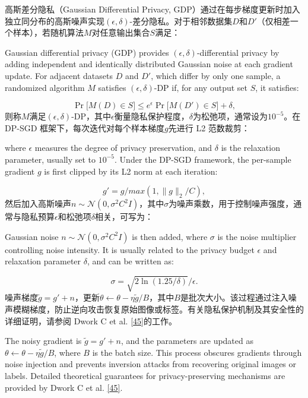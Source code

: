 高斯差分隐私（Gaussian Differential Privacy, GDP）通过在每步梯度更新时加入独立同分布的高斯噪声实现\((\epsilon, \delta)\)-差分隐私。对于相邻数据集\(D\)和\(D'\)（仅相差一个样本），若随机算法\(M\)对任意输出集合\(S\)满足：

Gaussian differential privacy (GDP) provides \((\epsilon, \delta)\)-differential privacy by adding independent and identically distributed Gaussian noise at each gradient update. For adjacent datasets \(D\) and \(D'\), which differ by only one sample, a randomized algorithm \(M\) satisfies \((\epsilon, \delta)\)-DP if, for any output set \(S\), it satisfies:

\begin{equation}\label{eq:dp-definition}
\Pr\lbrack M(D) \in S\rbrack \leq e^{\epsilon}\Pr\lbrack M(D') \in S\rbrack + \delta,
\end{equation}
则称\(M\)满足\((\epsilon, \delta)\)-DP，其中\(\epsilon\)衡量隐私保护程度，\(\delta\)为松弛项，通常设为\(10^{-5}\)。在 DP-SGD 框架下，每次迭代对每个样本梯度\(g\)先进行 L2 范数裁剪：

where \(\epsilon\) measures the degree of privacy preservation, and \(\delta\) is the relaxation parameter, usually set to \(10^{-5}\). Under the DP-SGD framework, the per-sample gradient \(g\) is first clipped by its L2 norm at each iteration:

\begin{equation}\label{eq:gradient-clip}
g' = g/max(1, \parallel g \parallel_{2}/C),
\end{equation}
然后加入高斯噪声\(n \sim \mathcal{N}(0,\sigma^{2}C^{2}I)\)，其中\(\sigma\)为噪声乘数，用于控制噪声强度，通常与隐私预算\(\epsilon\)和松弛项\(\delta\)相关，可写为：

Gaussian noise \(n \sim \mathcal{N}(0,\sigma^{2}C^{2}I)\) is then added, where \(\sigma\) is the noise multiplier controlling noise intensity. It is usually related to the privacy budget \(\epsilon\) and relaxation parameter \(\delta\), and can be written as:

\begin{equation}\label{eq:noise-multiplier}
\sigma = \sqrt{2\ln(1.25/\delta)}/\epsilon.
\end{equation}
噪声梯度\(\widetilde{g} = g' + n\)，更新\(\theta \leftarrow \theta - \eta\widetilde{g}/B\)，其中\(B\)是批次大小。该过程通过注入噪声模糊梯度，防止逆向攻击恢复原始图像或标签。有关隐私保护机制及其安全性的详细证明，请参阅 Dwork C et al. \hyperref[_Ref214903493]{{[}45{]}}的工作。

The noisy gradient is \(\widetilde{g} = g' + n\), and the parameters are updated as \(\theta \leftarrow \theta - \eta\widetilde{g}/B\), where \(B\) is the batch size. This process obscures gradients through noise injection and prevents inversion attacks from recovering original images or labels. Detailed theoretical guarantees for privacy-preserving mechanisms are provided by Dwork C et al. \hyperref[_Ref214903493]{{[}45{]}}.


